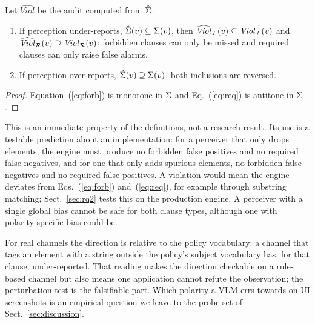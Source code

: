 \begin{proposition}
\label{prop:asym}
Let $\widehat{\mathit{Viol}}$ be the audit computed from $\hat{\Sigma}$.
\begin{enumerate}
\item If perception under-reports, $\hat{\Sigma}(v)\subseteq\Sigma(v)$, then
$\widehat{\mathit{Viol}}_{\mathcal{F}}(v)\subseteq\mathit{Viol}_{\mathcal{F}}(v)$ and
$\widehat{\mathit{Viol}}_{\mathcal{R}}(v)\supseteq\mathit{Viol}_{\mathcal{R}}(v)$: forbidden clauses
can only be missed and required clauses can only raise false alarms.
\item If perception over-reports, $\hat{\Sigma}(v)\supseteq\Sigma(v)$, both inclusions
are reversed.
\end{enumerate}
\end{proposition}
\begin{proof}
Equation~(\ref{eq:forb}) is monotone in $\Sigma$ and Eq.~(\ref{eq:req}) is antitone
in $\Sigma$.
\end{proof}

This is an immediate property of the definitions, not a research result. Its use
is a testable prediction about an implementation: for a perceiver that only drops
elements, the engine must produce no forbidden false positives and no required
false negatives, and for one that only adds spurious elements, no forbidden false
negatives and no required false positives. A violation would mean the engine
deviates from Eqs.~(\ref{eq:forb}) and~(\ref{eq:req}), for example through
substring matching; Sect.~\ref{sec:rq2} tests this on the production engine. A
perceiver with a single global bias cannot be safe for both clause types, although
one with polarity-specific bias could be.

For real channels the direction is relative to the policy vocabulary: a channel
that tags an element with a string outside the policy's subject vocabulary has,
for that clause, under-reported. That reading makes the direction checkable on a
rule-based channel but also means one application cannot refute the observation;
the perturbation test is the falsifiable part. Which polarity a VLM errs towards on
UI screenshots
\cite{alhamoud2025negation,yuksekgonul2023aro,ma2023crepe} is an empirical
question we leave to the probe set of Sect.~\ref{sec:discussion}.


